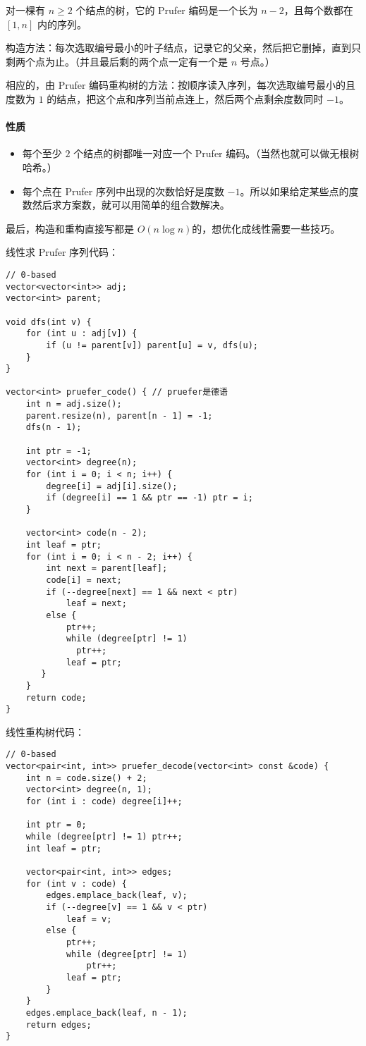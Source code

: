 对一棵有 $n \ge 2$ 个结点的树，它的 Prufer 编码是一个长为 $n - 2$，且每个数都在 $[1, n]$ 内的序列。

构造方法：每次选取编号最小的叶子结点，记录它的父亲，然后把它删掉，直到只剩两个点为止。（并且最后剩的两个点一定有一个是 $n$ 号点。）

相应的，由 Prufer 编码重构树的方法：按顺序读入序列，每次选取编号最小的且度数为 $1$ 的结点，把这个点和序列当前点连上，然后两个点剩余度数同时 $-1$。

\paragraph{性质}

\begin{itemize}
    \item 每个至少 $2$ 个结点的树都唯一对应一个 Prufer 编码。（当然也就可以做无根树哈希。）
    \item 每个点在 Prufer 序列中出现的次数恰好是度数 $-1$。所以如果给定某些点的度数然后求方案数，就可以用简单的组合数解决。
\end{itemize}


最后，构造和重构直接写都是 $O(n\log n)$的，想优化成线性需要一些技巧。

线性求 Prufer 序列代码：
\begin{verbatim}
// 0-based
vector<vector<int>> adj;
vector<int> parent;

void dfs(int v) {
    for (int u : adj[v]) {
        if (u != parent[v]) parent[u] = v, dfs(u);
    }
}

vector<int> pruefer_code() { // pruefer是德语
    int n = adj.size();
    parent.resize(n), parent[n - 1] = -1;
    dfs(n - 1);

    int ptr = -1;
    vector<int> degree(n);
    for (int i = 0; i < n; i++) {
        degree[i] = adj[i].size();
        if (degree[i] == 1 && ptr == -1) ptr = i;
    }

    vector<int> code(n - 2);
    int leaf = ptr;
    for (int i = 0; i < n - 2; i++) {
        int next = parent[leaf];
        code[i] = next;
        if (--degree[next] == 1 && next < ptr)
            leaf = next;
        else {
            ptr++;
            while (degree[ptr] != 1)
              ptr++;
            leaf = ptr;
       }
    }
    return code;
}
\end{verbatim}

线性重构树代码：
\begin{verbatim}
// 0-based
vector<pair<int, int>> pruefer_decode(vector<int> const &code) {
    int n = code.size() + 2;
    vector<int> degree(n, 1);
    for (int i : code) degree[i]++;

    int ptr = 0;
    while (degree[ptr] != 1) ptr++;
    int leaf = ptr;

    vector<pair<int, int>> edges;
    for (int v : code) {
        edges.emplace_back(leaf, v);
        if (--degree[v] == 1 && v < ptr)
            leaf = v;
        else {
            ptr++;
            while (degree[ptr] != 1)
                ptr++;
            leaf = ptr;
        }
    }
    edges.emplace_back(leaf, n - 1);
    return edges;
}
\end{verbatim}

